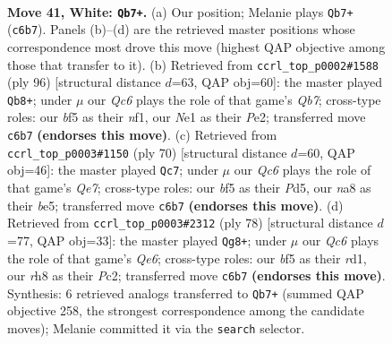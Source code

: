 \documentclass[11pt]{article}
\begin{document}
\clearpage

\begin{figure}[p]\centering
\begin{subfigure}{0.46\textwidth}\centering
\resizebox{\linewidth}{!}{%
\newchessgame
\chessboard[
  setfen={n6r/7k/2Q5/1p3b2/6pp/P2P1P2/7K/4Nq2 w - - 12 41},
  showmover=false,
  pgfstyle=straightmove, color=movearrow, markmove={c6-b7}
]}
\caption{}
\end{subfigure}\hfill
\begin{subfigure}{0.46\textwidth}\centering
\resizebox{\linewidth}{!}{%
\newchessgame
\chessboard[
  setfen={3k4/1Q6/4p3/8/p5p1/P4PP1/4Pq2/5nNK w - - 19 49},
  showmover=false,
  pgfstyle=straightmove, color=movearrow, markmove={b7-b8}
]}
\caption{}
\end{subfigure}
\\[4pt]
\begin{subfigure}{0.46\textwidth}\centering
\resizebox{\linewidth}{!}{%
\newchessgame
\chessboard[
  setfen={8/4Q2p/k2p4/3Pb3/q1P5/4P1p1/2N4P/6K1 w - - 0 36},
  showmover=false,
  pgfstyle=straightmove, color=movearrow, markmove={e7-c7}
]}
\caption{}
\end{subfigure}\hfill
\begin{subfigure}{0.46\textwidth}\centering
\resizebox{\linewidth}{!}{%
\newchessgame
\chessboard[
  setfen={3k4/8/p2pQ2p/1p6/4PN2/PP3q2/K1P5/3r4 w - - 1 40},
  showmover=false,
  pgfstyle=straightmove, color=movearrow, markmove={e6-g8}
]}
\caption{}
\end{subfigure}
\caption{\textbf{Move 41, White: \texttt{Qb7+}.} (a) Our position; Melanie plays \texttt{Qb7+} (\texttt{c6b7}). Panels (b)--(d) are the retrieved master positions whose correspondence most drove this move (highest QAP objective among those that transfer to it). (b) Retrieved from \texttt{ccrl\_top\_p0002\#1588} (ply 96) [structural distance $d$=63, QAP obj=60]: the master played \texttt{Qb8+}; under $\mu$ our \emph{Qc6} plays the role of that game's \emph{Qb7}; cross-type roles: our \emph{b}f5 as their \emph{n}f1, our \emph{N}e1 as their \emph{P}e2; transferred move \texttt{c6b7} \textbf{(endorses this move)}. (c) Retrieved from \texttt{ccrl\_top\_p0003\#1150} (ply 70) [structural distance $d$=60, QAP obj=46]: the master played \texttt{Qc7}; under $\mu$ our \emph{Qc6} plays the role of that game's \emph{Qe7}; cross-type roles: our \emph{b}f5 as their \emph{P}d5, our \emph{n}a8 as their \emph{b}e5; transferred move \texttt{c6b7} \textbf{(endorses this move)}. (d) Retrieved from \texttt{ccrl\_top\_p0003\#2312} (ply 78) [structural distance $d$=77, QAP obj=33]: the master played \texttt{Qg8+}; under $\mu$ our \emph{Qc6} plays the role of that game's \emph{Qe6}; cross-type roles: our \emph{b}f5 as their \emph{r}d1, our \emph{r}h8 as their \emph{P}c2; transferred move \texttt{c6b7} \textbf{(endorses this move)}. Synthesis: 6 retrieved analogs transferred to \texttt{Qb7+} (summed QAP objective 258, the strongest correspondence among the candidate moves); Melanie committed it via the \texttt{search} selector.}
\label{fig:thought-m80}
\end{figure}
\end{document}
